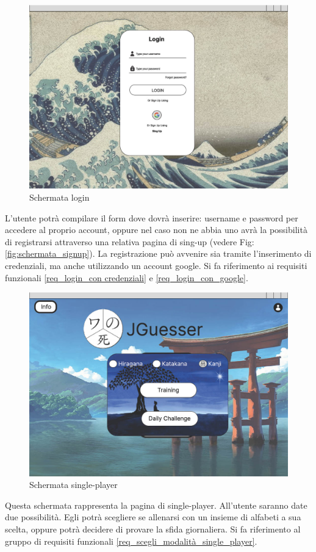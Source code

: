 \begin{figure}[!h]
\centering
\includegraphics[scale=0.35]{images/login.jpg}
\caption{Schermata login}
\label{fig:schermata_login}
\end{figure}
\noindent 
L'utente potrà compilare il form dove dovrà inserire: username e password per accedere al proprio account, oppure nel caso non ne abbia uno avrà la possibilità di registrarsi attraverso una relativa pagina di sing-up (vedere Fig:\ref{fig:schermata_signup}). La registrazione può avvenire sia tramite l'inserimento di credenziali, ma anche utilizzando un account google. Si fa riferimento ai requisiti funzionali \ref{req_login_con credenziali} e \ref{req_login_con_google}.

\begin{figure}[!h]
\centering
\includegraphics[scale=0.35]{images/single-player.jpg}
\caption{Schermata single-player}
\label{fig:schermata_gioca_single-player}
\end{figure}
\noindent
Questa schermata rappresenta la pagina di single-player. All'utente saranno date due possibilità. Egli potrà scegliere se allenarsi con un insieme di alfabeti a sua scelta, oppure potrà decidere di provare la sfida giornaliera. Si fa riferimento al gruppo di requisiti funzionali \ref{req_scegli_modalità_single_player}.

